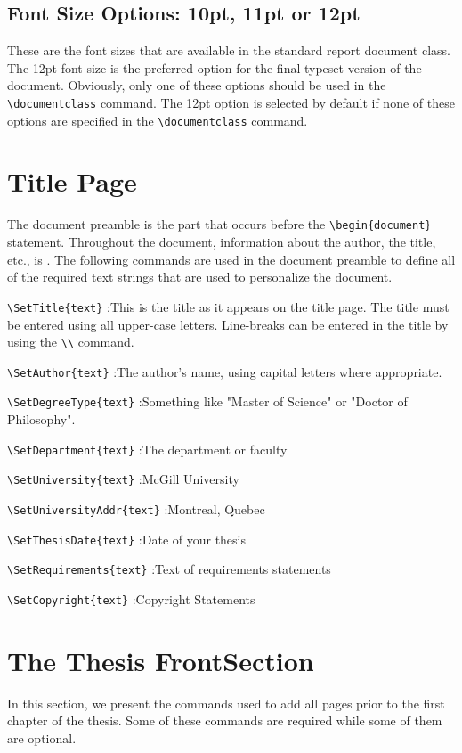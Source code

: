 \documentclass[12pt,Bold,letterpaper,TexShade]{mcgilletdclass}
\numberwithin{equation}{section}
\begin{document}
\section{Font Size Options: 10pt, 11pt or 12pt}
These are the font sizes that are available in the standard \LaTeXe report 
document class. The 12pt font size is the preferred option for the final 
typeset version of the document. Obviously, only one of these options should 
be used in the \verb=\documentclass= command. The 12pt option is selected by default 
if none of these options are specified in
the \verb=\documentclass= command.


\chapter{Title Page}
The document preamble is the part that occurs before the \verb=\begin{document}=
statement. Throughout the document, information about the author,
the title, etc., is . The following commands are used in
the document preamble to define all of the required text strings that
are used to personalize the document.
\begin{BulletList}
	\item{\verb=\SetTitle{text}= :This is the title as it appears on the 
title page. The title must be entered using
all upper-case letters. Line-breaks can be entered in the title by
using the \verb=\\= command.}
	\item{\verb=\SetAuthor{text}= :The author's name, using capital letters 
where appropriate.}
	\item{\verb=\SetDegreeType{text}= :Something like "Master of Science" or 
"Doctor of Philosophy".}
	\item{\verb=\SetDepartment{text}= :The department or faculty }
	\item{\verb=\SetUniversity{text}= :McGill University }
	\item{\verb=\SetUniversityAddr{text}= :Montreal, Quebec}
	\item{\verb=\SetThesisDate{text}= :Date of your thesis}%
	\item{\verb=\SetRequirements{text}= :Text of requirements statements }%
	\item{\verb=\SetCopyright{text}= :Copyright Statements}%
\end{BulletList}


\chapter{The Thesis FrontSection}
In this section, we present the commands used to add all pages prior to
the first chapter of the thesis. Some of these commands are required
while some of them are optional.
\end{document}
